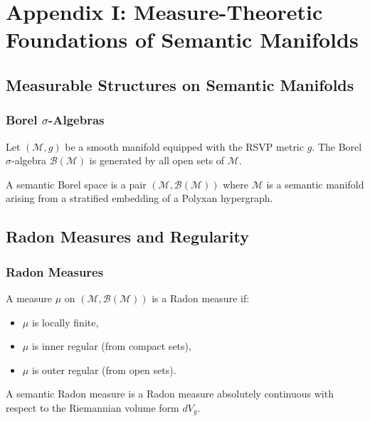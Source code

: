 \chapter*{Appendix I: Measure-Theoretic Foundations of Semantic Manifolds}

\section{Measurable Structures on Semantic Manifolds}

\subsection{Borel $\sigma$-Algebras}

Let $(\mathcal{M},g)$ be a smooth manifold equipped with the RSVP metric $g$.
The Borel $\sigma$-algebra $\mathcal{B}(\mathcal{M})$ is generated by all open sets of $\mathcal{M}$.

\begin{definition}
A semantic Borel space is a pair $(\mathcal{M},\mathcal{B}(\mathcal{M}))$ where $\mathcal{M}$ is a semantic manifold arising from a stratified embedding of a Polyxan hypergraph.
\end{definition}

\section{Radon Measures and Regularity}

\subsection{Radon Measures}

A measure $\mu$ on $(\mathcal{M},\mathcal{B}(\mathcal{M}))$ is a Radon measure if:
\begin{itemize}
\item $\mu$ is locally finite,
\item $\mu$ is inner regular (from compact sets),
\item $\mu$ is outer regular (from open sets).
\end{itemize}

\begin{definition}
A semantic Radon measure is a Radon measure absolutely continuous with respect to the Riemannian volume form $dV_g$.
\end{definition}

